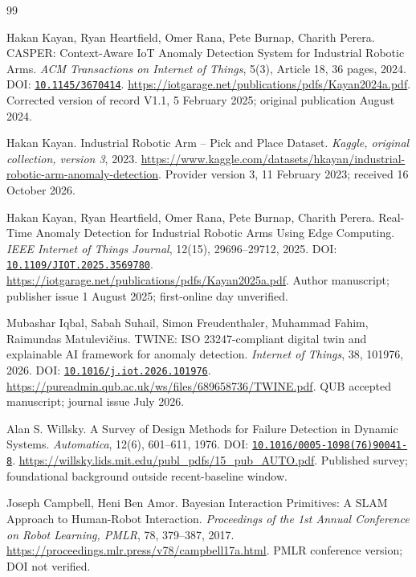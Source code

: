 \begin{thebibliography}{99}

 Hakan Kayan, Ryan Heartfield, Omer Rana, Pete Burnap, Charith Perera. CASPER: Context-Aware IoT Anomaly Detection System for Industrial Robotic Arms. \emph{ACM Transactions on Internet of Things}, 5(3), Article 18, 36 pages, 2024. DOI: \href{https://doi.org/10.1145/3670414}{\nolinkurl{10.1145/3670414}}. \url{https://iotgarage.net/publications/pdfs/Kayan2024a.pdf}. Corrected version of record V1.1, 5 February 2025; original publication August 2024.

 Hakan Kayan. Industrial Robotic Arm -- Pick and Place Dataset. \emph{Kaggle, original collection, version 3}, 2023. \url{https://www.kaggle.com/datasets/hkayan/industrial-robotic-arm-anomaly-detection}. Provider version 3, 11 February 2023; received 16 October 2026.

 Hakan Kayan, Ryan Heartfield, Omer Rana, Pete Burnap, Charith Perera. Real-Time Anomaly Detection for Industrial Robotic Arms Using Edge Computing. \emph{IEEE Internet of Things Journal}, 12(15), 29696--29712, 2025. DOI: \href{https://doi.org/10.1109/JIOT.2025.3569780}{\nolinkurl{10.1109/JIOT.2025.3569780}}. \url{https://iotgarage.net/publications/pdfs/Kayan2025a.pdf}. Author manuscript; publisher issue 1 August 2025; first-online day unverified.

 Mubashar Iqbal, Sabah Suhail, Simon Freudenthaler, Muhammad Fahim, Raimundas Matulevičius. TWINE: ISO 23247-compliant digital twin and explainable AI framework for anomaly detection. \emph{Internet of Things}, 38, 101976, 2026. DOI: \href{https://doi.org/10.1016/j.iot.2026.101976}{\nolinkurl{10.1016/j.iot.2026.101976}}. \url{https://pureadmin.qub.ac.uk/ws/files/689658736/TWINE.pdf}. QUB accepted manuscript; journal issue July 2026.

 Alan S. Willsky. A Survey of Design Methods for Failure Detection in Dynamic Systems. \emph{Automatica}, 12(6), 601--611, 1976. DOI: \href{https://doi.org/10.1016/0005-1098(76)90041-8}{\nolinkurl{10.1016/0005-1098(76)90041-8}}. \url{https://willsky.lids.mit.edu/publ_pdfs/15_pub_AUTO.pdf}. Published survey; foundational background outside recent-baseline window.

 Joseph Campbell, Heni Ben Amor. Bayesian Interaction Primitives: A SLAM Approach to Human-Robot Interaction. \emph{Proceedings of the 1st Annual Conference on Robot Learning, PMLR}, 78, 379--387, 2017. \url{https://proceedings.mlr.press/v78/campbell17a.html}. PMLR conference version; DOI not verified.


\end{thebibliography}
